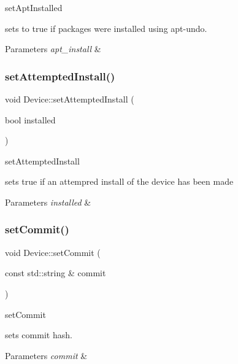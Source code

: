 set\+Apt\+Installed 

sets to true if packages were installed using apt-\/undo. 
\begin{DoxyParams}{Parameters}
{\em apt\+\_\+install} & \\
\hline
\end{DoxyParams}
\mbox{\label{classDevice_af2591540bf77d38b8e4c09b90e8dfaba}} 
\subsubsection{\texorpdfstring{set\+Attempted\+Install()}{setAttemptedInstall()}}
{\footnotesize\ttfamily void Device\+::set\+Attempted\+Install (\begin{DoxyParamCaption}\item[{bool}]{installed }\end{DoxyParamCaption})}



set\+Attempted\+Install 

sets true if an attempred install of the device has been made 
\begin{DoxyParams}{Parameters}
{\em installed} & \\
\hline
\end{DoxyParams}
\mbox{\label{classDevice_a2d549bad1c70b5768698dbc2175669ef}} 
\subsubsection{\texorpdfstring{set\+Commit()}{setCommit()}}
{\footnotesize\ttfamily void Device\+::set\+Commit (\begin{DoxyParamCaption}\item[{const std\+::string \&}]{commit }\end{DoxyParamCaption})}



set\+Commit 

sets commit hash. 
\begin{DoxyParams}{Parameters}
{\em commit} & \\
\hline
\end{DoxyParams}
\mbox{\label{classDevice_a3f71228960ac3bfca0a1cca254ea782b}} 
